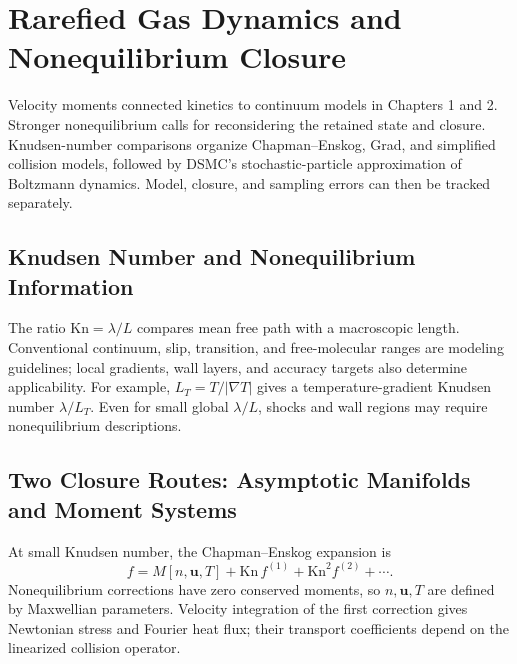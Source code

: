 \chapter{Rarefied Gas Dynamics and Nonequilibrium Closure}\label{ch:17}
\begin{chaptersummary}
Velocity moments connected kinetics to continuum models in Chapters 1 and 2. Stronger nonequilibrium calls for reconsidering the retained state and closure. Knudsen-number comparisons organize Chapman--Enskog, Grad, and simplified collision models, followed by DSMC's stochastic-particle approximation of Boltzmann dynamics. Model, closure, and sampling errors can then be tracked separately.
\end{chaptersummary}

\section{Knudsen Number and Nonequilibrium Information}
The ratio $\mathrm{Kn}=\lambda/L$ compares mean free path with a macroscopic length.
Conventional continuum, slip, transition, and free-molecular ranges are modeling guidelines;
local gradients, wall layers, and accuracy targets also determine applicability.
For example, $L_T=T/|\nabla T|$ gives a temperature-gradient Knudsen number $\lambda/L_T$.
Even for small global $\lambda/L$, shocks and wall regions may require nonequilibrium descriptions.

\section{Two Closure Routes: Asymptotic Manifolds and Moment Systems}
At small Knudsen number, the Chapman--Enskog expansion is
\[
f=M[n,\bm u,T]+\mathrm{Kn}\,f^{(1)}
+\mathrm{Kn}^2f^{(2)}+\cdots.
\]
Nonequilibrium corrections have zero conserved moments, so $n,\bm u,T$ are defined by Maxwellian parameters.
Velocity integration of the first correction gives Newtonian stress and Fourier heat flux;
their transport coefficients depend on the linearized collision operator.

